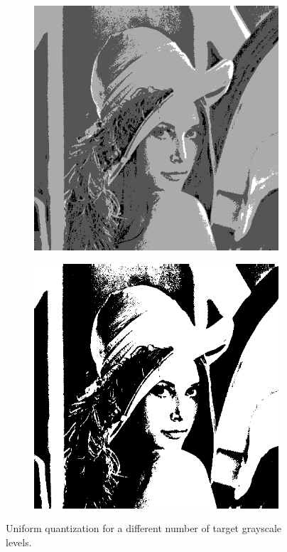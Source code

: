 \documentclass{article}
\begin{document}
\begin{figure}
\begin{subfigure}[c]{0.3\textwidth}
        \end{subfigure}
        \hfill
        \begin{subfigure}[c]{0.3\textwidth}
            \includegraphics[width=\textwidth]{images/lena-y_4.png}
        \end{subfigure}
        \hfill
        \begin{subfigure}[c]{0.3\textwidth}
            \includegraphics[width=\textwidth]{images/lena-y_2.png}
        \end{subfigure}
        \caption{Uniform quantization for a different number of target grayscale levels.}
        \label{fig:quantization}
    \end{figure}
\end{document}
